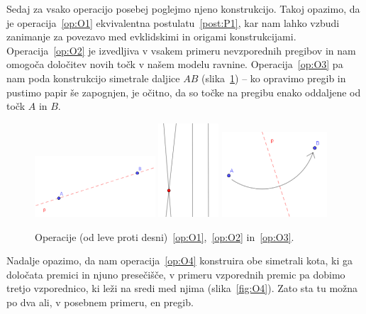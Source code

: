 Sedaj za vsako operacijo posebej poglejmo njeno konstrukcijo. Takoj opazimo, da je operacija~\ref{op:O1} ekvivalentna postulatu~\ref{post:P1}, kar nam lahko vzbudi zanimanje za povezavo med evklidskimi in origami konstrukcijami. Operacija~\ref{op:O2} je izvedljiva v vsakem primeru nevzporednih pregibov in nam omogoča določitev novih točk v našem modelu ravnine. Operacija~\ref{op:O3} pa nam poda konstrukcijo simetrale daljice $AB$ (slika~\ref{fig:O1-O3}) -- ko opravimo pregib in pustimo papir še zapognjen, je očitno, da so točke na pregibu enako oddaljene od točk $A$ in $B$.

\begin{figure}[h]
    \centering
    \includegraphics[width=0.4\textwidth]{images/origami_operacije/O1.png}
    \includegraphics[width=0.2\textwidth]{images/origami_operacije/O2.png}
    \includegraphics[width=0.35\textwidth]{images/origami_operacije/O3.png}
    \caption[Operacije~\ref{op:O1},~\ref{op:O2} in~\ref{op:O3}]{Operacije (od leve proti desni)~\ref{op:O1},~\ref{op:O2} in~\ref{op:O3}.}
    \label{fig:O1-O3}
\end{figure}

Nadalje opazimo, da nam operacija~\ref{op:O4} konstruira obe simetrali kota, ki ga določata premici in njuno presečišče, v primeru vzporednih premic pa dobimo tretjo vzporednico, ki leži na sredi med njima (slika~\ref{fig:O4}). Zato sta tu možna po dva ali, v posebnem primeru, en pregib.

